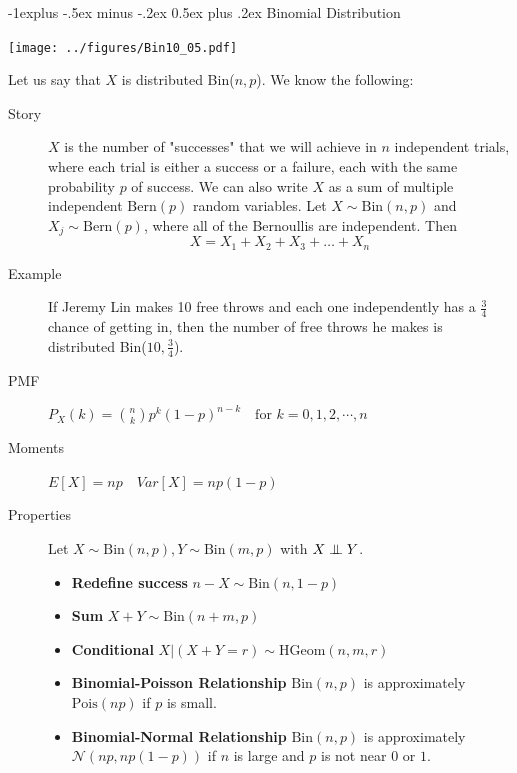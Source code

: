 \documentclass[10pt,landscape]{article}
\makeatletter
\newcommand\independent{\protect\mathpalette{\protect\independenT}{\perp}}
\def\independenT#1#2{\mathrel{\setbox0\hbox{$#1#2$}%
\copy0\kern-\wd0\mkern4mu\box0}}
\newcommand{\N}{\mathcal{N}}
\newcommand{\Bern}{\textrm{Bern}}
\newcommand{\Bin}{\textrm{Bin}}
\newcommand{\Pois}{\textrm{Pois}}
\newcommand{\HGeom}{\textrm{HGeom}}
\renewcommand{\subsection}{\@startsection{subsection}{2}{0mm}%
{-1explus -.5ex minus -.2ex}%
{0.5ex plus .2ex}%
{\normalfont\normalsize\bfseries}}
\makeatother
\begin{document}
\begin{multicols*}{3}
        \subsection{Binomial Distribution}
        \begin{minipage}{\linewidth}
            \centering
            \texttt{[image: ../figures/Bin10\_05.pdf]}
        \end{minipage}

        Let us say that $X$ is distributed \Bin($n,p$). We know the following:
        \begin{description}
            \item[Story] $X$ is the number of "successes" that we will achieve in $n$ independent trials, where each trial is either a success or a failure, each with the same probability $p$ of success. We can also write $X$ as a sum of multiple independent $\Bern(p)$ random variables. Let $X \sim \Bin(n, p)$ and $X_j \sim \Bern(p)$, where all of the Bernoullis are independent. Then
            \[X = X_1 + X_2 + X_3 + \dots + X_n\]
            \item[Example] If Jeremy Lin makes 10 free throws and each one independently has a $\frac{3}{4}$ chance of getting in, then the number of free throws he makes is distributed  \Bin($10,\frac{3}{4}$).
            \item[PMF] $P_X(k) = {n  \choose k} p^k(1-p)^{n-k} \quad \text{for  } k=0,1,2,\cdots,n$
            \item[Moments] $E[X] = np \quad Var[X] = np(1-p)$
            \item[Properties] Let $X \sim \Bin(n,p), Y \sim \Bin(m,p)$ with $X \independent Y$.
            \begin{itemize}
                \item \textbf{Redefine success} $n-X \sim \Bin(n,1-p)$
                \item \textbf{Sum} $X+Y \sim \Bin(n+m,p)$
                \item \textbf{Conditional} $X|(X+Y=r) \sim \HGeom(n,m,r)$
                \item \textbf{Binomial-Poisson Relationship} $\Bin(n, p)$ is approximately  $\Pois(np)$ if $p$ is small.
                \item \textbf{Binomial-Normal Relationship} $\Bin(n, p)$ is approximately $\N(np,np(1-p))$ if $n$ is large and $p$ is not near $0$ or $1$.
            \end{itemize}
        \end{description}


\end{multicols*}
\end{document}
